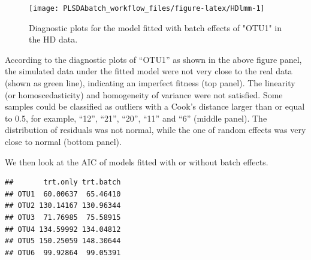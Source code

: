 \documentclass[
]{book}
\newenvironment{Shaded}{\begin{snugshade}}{\end{snugshade}}
\newcommand{\AttributeTok}[1]{\textcolor[rgb]{0.77,0.63,0.00}{#1}}
\newcommand{\ControlFlowTok}[1]{\textcolor[rgb]{0.13,0.29,0.53}{\textbf{#1}}}
\newcommand{\DecValTok}[1]{\textcolor[rgb]{0.00,0.00,0.81}{#1}}
\newcommand{\FunctionTok}[1]{\textcolor[rgb]{0.00,0.00,0.00}{#1}}
\newcommand{\NormalTok}[1]{#1}
\newcommand{\OtherTok}[1]{\textcolor[rgb]{0.56,0.35,0.01}{#1}}
\newcommand{\SpecialCharTok}[1]{\textcolor[rgb]{0.00,0.00,0.00}{#1}}
\newcommand{\StringTok}[1]{\textcolor[rgb]{0.31,0.60,0.02}{#1}}
\begin{document}
\begin{Shaded}
\end{Shaded}

\begin{figure}

{\centering \texttt{[image: PLSDAbatch\_workflow\_files/figure-latex/HDlmm-1]} 

}

\caption{Diagnostic plots for the model fitted with batch effects of "OTU1" in the HD data.}\label{fig:HDlmm}
\end{figure}

According to the diagnostic plots of ``OTU1'' as shown in the above figure panel, the simulated data under the fitted model were not very close to the real data (shown as green line), indicating an imperfect fitness (top panel). The linearity (or homoscedasticity) and homogeneity of variance were not satisfied. Some samples could be classified as outliers with a Cook's distance larger than or equal to 0.5, for example, ``12'', ``21'', ``20'', ``11'' and ``6'' (middle panel). The distribution of residuals was not normal, while the one of random effects was very close to normal (bottom panel).

We then look at the AIC of models fitted with or without batch effects.

\begin{Shaded}
\end{Shaded}

\begin{verbatim}
##       trt.only trt.batch
## OTU1  60.00637  65.46410
## OTU2 130.14167 130.96344
## OTU3  71.76985  75.58915
## OTU4 134.59992 134.04812
## OTU5 150.25059 148.30644
## OTU6  99.92864  99.05391
\end{verbatim}
\end{document}
